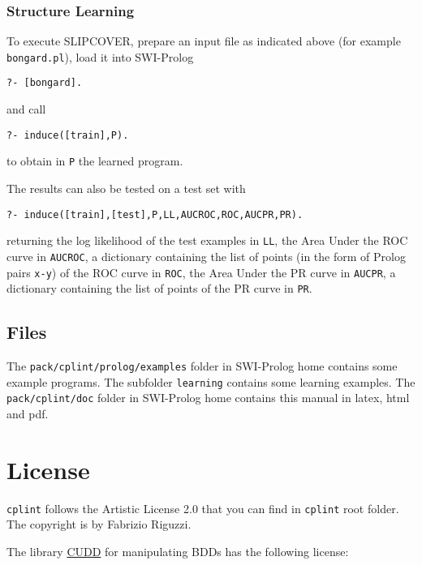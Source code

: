 \documentclass[a4paper,10pt]{article}
\begin{document}


\subsubsection{Structure Learning}
To execute SLIPCOVER,
prepare an input file as indicated above 
(for example \verb|bongard.pl|), load it into SWI-Prolog
\begin{verbatim}
?- [bongard].
\end{verbatim}
and call
\begin{verbatim}
?- induce([train],P).
\end{verbatim}
to obtain in \verb|P| the learned program.

The results can also be tested on a test set with
\begin{verbatim}
?- induce([train],[test],P,LL,AUCROC,ROC,AUCPR,PR).
\end{verbatim}
returning the log likelihood of the test examples in \verb|LL|, the Area Under the ROC curve in \verb|AUCROC|, a dictionary containing the list of points (in the form of Prolog pairs \verb|x-y|) of the ROC curve in \verb|ROC|,
the Area Under the PR curve in \verb|AUCPR|, a dictionary containing the list of points of the PR curve in \verb|PR|.



\subsection{Files}
The \texttt{pack/cplint/prolog/examples} folder in SWI-Prolog home contains some example programs. The subfolder \texttt{learning} contains some learning examples.
The \texttt{pack/cplint/doc} folder in SWI-Prolog home contains this manual in latex, html and pdf.


\section{License}
\label{license}



\texttt{cplint} follows the Artistic License 2.0 that you can find in \texttt{cplint} root folder. The copyright is by Fabrizio Riguzzi.
\vspace{3mm}


The library \href{http://vlsi.colorado.edu/\string ~fabio/}{CUDD} for manipulating BDDs has the following license:

\vspace{3mm}
\end{document}
